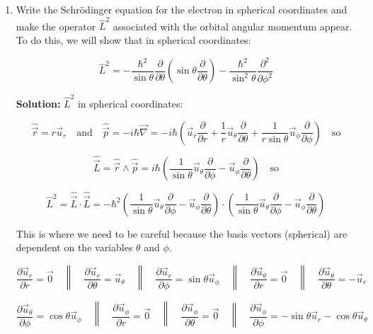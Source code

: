 \documentclass{article}
\begin{document}
    \begin{enumerate}
        \item Write the Schrödinger equation for the electron in spherical coordinates and make the operator $\hat{L}^{2}$ associated with the orbital angular momentum appear. To do this, we will show that in spherical coordinates:

    $$
    \hat{L}^{2} = -\frac{\hbar^{2}}{\sin \theta} \frac{\partial}{\partial \theta}\left(\sin \theta \frac{\partial}{\partial \theta}\right) - \frac{\hbar^{2}}{\sin ^{2} \theta} \frac{\partial^{2}}{\partial \phi^{2}}
    $$

    {\color{red}\textbf{Solution:} $\hat{L}^{2}$ in spherical coordinates:

    $$
    \hat{\vec{r}} = r \vec{u}_{r} \quad \text{and} \quad \hat{\vec{p}} = -i \hbar \vec{\nabla} = -i \hbar \left(\vec{u}_{r} \frac{\partial}{\partial r} + \frac{1}{r} \vec{u}_{\theta} \frac{\partial}{\partial \theta} + \frac{1}{r \sin \theta} \vec{u}_{\phi} \frac{\partial}{\partial \phi}\right) \quad \text{so}
    $$

    $$
    \hat{\vec{L}} = \hat{\vec{r}} \wedge \hat{\vec{p}} = i \hbar \left(\frac{1}{\sin \theta} \vec{u}_{\theta} \frac{\partial}{\partial \phi} - \vec{u}_{\phi} \frac{\partial}{\partial \theta}\right) \quad \text{so}
    $$

    $$
    \hat{L}^{2} = \hat{\vec{L}} \cdot \hat{\vec{L}} = -\hbar^{2} \left(\frac{1}{\sin \theta} \vec{u}_{\theta} \frac{\partial}{\partial \phi} - \vec{u}_{\phi} \frac{\partial}{\partial \theta}\right) \cdot \left(\frac{1}{\sin \theta} \vec{u}_{\theta} \frac{\partial}{\partial \phi} - \vec{u}_{\phi} \frac{\partial}{\partial \theta}\right)
    $$

    This is where we need to be careful because the basis vectors (spherical) are dependent on the variables $\theta$ and $\phi$.

    $$
    \frac{\partial \vec{u}_{r}}{\partial r} = \overrightarrow{0} \quad \left\|\quad \frac{\partial \vec{u}_{r}}{\partial \theta} = \vec{u}_{\theta} \quad\right\| \quad \frac{\partial \vec{u}_{r}}{\partial \phi} = \sin \theta \vec{u}_{\phi} \quad \left\|\quad \frac{\partial \vec{u}_{\theta}}{\partial r} = \overrightarrow{0} \quad\right\| \quad \frac{\partial \vec{u}_{\theta}}{\partial \theta} = -\vec{u}_{r}
    $$

    $$
    \frac{\partial \vec{u}_{\theta}}{\partial \phi} = \cos \theta \vec{u}_{\phi} \quad \left\|\quad \frac{\partial \vec{u}_{\phi}}{\partial r} = \overrightarrow{0} \quad\right\| \quad \frac{\partial \vec{u}_{\phi}}{\partial \theta} = \overrightarrow{0} \quad \left\|\quad \frac{\partial \vec{u}_{\phi}}{\partial \phi} = -\sin \theta \vec{u}_{r} - \cos \theta \vec{u}_{\theta}\right.
    $$

}
\end{enumerate}
\end{document}
